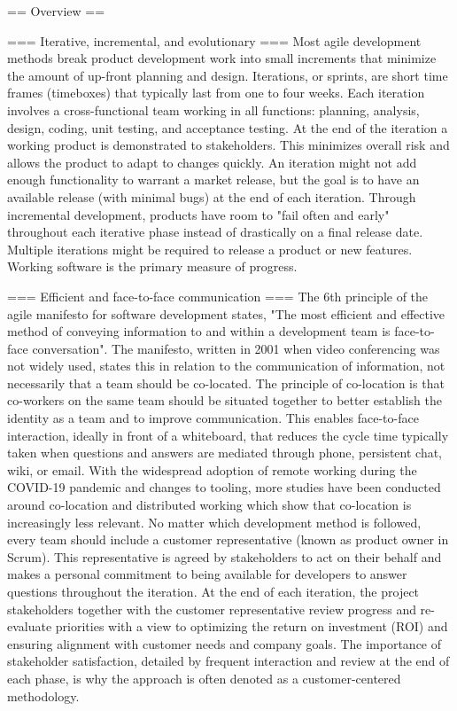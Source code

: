 == Overview ==


=== Iterative, incremental, and evolutionary ===
Most agile development methods break product development work into small increments that minimize the amount of up-front planning and design. Iterations, or sprints, are short time frames (timeboxes) that typically last from one to four weeks. Each iteration involves a cross-functional team working in all functions: planning, analysis, design, coding, unit testing, and acceptance testing. At the end of the iteration a working product is demonstrated to stakeholders. This minimizes overall risk and allows the product to adapt to changes quickly. An iteration might not add enough functionality to warrant a market release, but the goal is to have an available release (with minimal bugs) at the end of each iteration. Through incremental development, products have room to "fail often and early" throughout each iterative phase instead of drastically on a final release date. Multiple iterations might be required to release a product or new features. Working software is the primary measure of progress.


=== Efficient and face-to-face communication ===
The 6th principle of the agile manifesto for software development states, "The most efficient and effective method of conveying information to and within a development team is face-to-face conversation". The manifesto, written in 2001 when video conferencing was not widely used, states this in relation to the communication of information, not necessarily that a team should be co-located.
The principle of co-location is that co-workers on the same team should be situated together to better establish the identity as a team and to improve communication. This enables face-to-face interaction, ideally in front of a whiteboard, that reduces the cycle time typically taken when questions and answers are mediated through phone, persistent chat, wiki, or email. With the widespread adoption of remote working during the COVID-19 pandemic and changes to tooling, more studies have been conducted around co-location and distributed working which show that co-location is increasingly less relevant.
No matter which development method is followed, every team should include a customer representative (known as product owner in Scrum). This representative is agreed by stakeholders to act on their behalf and makes a personal commitment to being available for developers to answer questions throughout the iteration. At the end of each iteration, the project stakeholders together with the customer representative review progress and re-evaluate priorities with a view to optimizing the return on investment (ROI) and ensuring alignment with customer needs and company goals. The importance of stakeholder satisfaction, detailed by frequent interaction and review at the end of each phase, is why the approach is often denoted as a customer-centered methodology.


